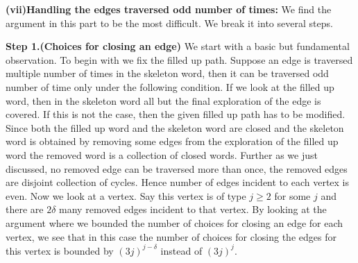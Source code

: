 \documentclass[12pt]{article}
\numberwithin{equation}{section}
\numberwithin{equation}{section}
\theoremstyle{definition}
\renewcommand{\1}{\bf 1}
\begin{document}
\noindent 
\textbf{(vii)Handling the edges traversed odd number of times:}
We find the argument in this part to be the most difficult. We break it into several steps.

\noindent
\textbf{Step 1.(Choices for closing an edge)} We start with a basic but fundamental observation. To begin with we fix the filled up path. Suppose an edge is traversed multiple number of times in the skeleton word, then it can be traversed odd number of time only under the following condition. If we look at the filled up word, then in the skeleton word all but the final exploration of the edge is covered. If this is not the case, then the given filled up path has to be modified. Since both the filled up word and the skeleton word are closed and the skeleton word is obtained by removing some edges from the exploration of the filled up word the removed word is a collection of closed words. Further as we just discussed, no removed edge can be traversed more than once, the removed edges are disjoint collection of cycles. Hence number of edges incident to each vertex is even. Now we look at a vertex. Say this vertex is of type $j\ge 2$ for some $j$ and there are $2\delta$ many removed edges incident to that vertex. By looking at the argument where we bounded the number of choices for closing an edge for each vertex, we see that in this case the number of choices for closing the edges for this vertex is bounded by $(3j)^{j-\delta}$ instead of $(3j)^{j}$.  
\end{document}
